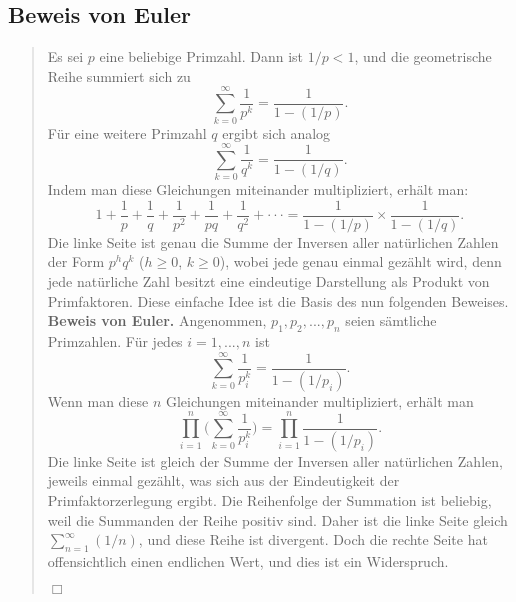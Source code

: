 \documentclass[12pt,a4paper]{article}
\theoremstyle{definition}
\begin{document}
\subsection{Beweis von Euler}\label{Beweis von Euler}
\begin{quote}
\small
Es sei $p$ eine beliebige Primzahl. Dann ist $1/p < 1$, und die geometrische Reihe summiert sich zu
\[\sum_{k=0}^\infty \frac{1}{p^k} = \frac{1}{1-(1/p)}.\]
Für eine weitere Primzahl $q$ ergibt sich analog
\[\sum_{k=0}^\infty \frac{1}{q^k} = \frac{1}{1-(1/q)}.\]
Indem man diese Gleichungen miteinander multipliziert, erhält man:
\[1 + \frac{1}p + \frac{1}q + \frac{1}{p^2} + \frac{1}{pq} + \frac{1}{q^2} + \cdot\cdot\cdot = \frac{1}{1-(1/p)} \times \frac{1}{1-(1/q)}.\]
Die linke Seite ist genau die Summe der Inversen aller natürlichen Zahlen der Form ${p^h}{q^k}$ ($h \geq 0$, $k \geq0$), wobei jede genau einmal gezählt wird, denn jede natürliche Zahl besitzt eine eindeutige Darstellung als Produkt von Primfaktoren.
Diese einfache Idee ist die Basis des nun folgenden Beweises.\newline
\textbf{Beweis von Euler.} Angenommen, $p_1, p_2, ..., p_n$ seien sämtliche Primzahlen.
Für jedes $i = 1, ..., n$ ist
\[\sum_{k=0}^\infty \frac{1}{p^k_i} = \frac{1}{1-(1/p_i)}.\]
Wenn man diese $n$ Gleichungen miteinander multipliziert, erhält man
\[\prod_{i=1}^n \Biggl(\sum_{k=0}^\infty \frac{1}{p^k_i}\Biggr) = \prod_{i=1}^n \frac{1}{1-(1/p_i)}.\]
Die linke Seite ist gleich der Summe der Inversen aller natürlichen Zahlen, jeweils einmal gezählt, was sich aus der Eindeutigkeit der Primfaktorzerlegung ergibt.\newline
Die Reihenfolge der Summation ist beliebig, weil die Summanden der Reihe positiv sind.
Daher ist die linke Seite gleich $\sum_{n=1}^\infty (1/n)$, und diese Reihe ist divergent.
Doch die rechte Seite hat offensichtlich einen endlichen Wert, und dies ist ein Widerspruch.\newline
\autocite[8--9]{Ribenboim2006}
\begin{flushright}
$\Box$
\end{flushright}
\end{quote}

\newpage

\section*{}
\printbibliography

\listoftables
{}

\listoffigures
{}
\end{document}
